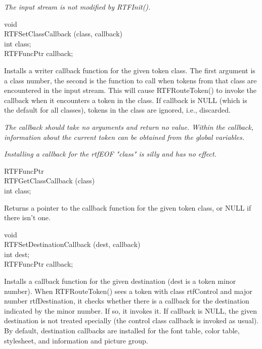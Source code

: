 \documentclass{article}
\begin{document}
\noindent
{\em The input stream is not modified by RTFInit().



}
\noindent
void\\
RTFSetClassCallback (class, callback)\\
int		class;\\
RTFFuncPtr	callback;




\noindent
Installs a writer callback function for the given token class. The first 
argument is a class number, the second is the function to call when tokens 
from that class are encountered in the input stream. This will cause RTFRouteToken() 
to invoke the callback when it encounters a token in the class. If callback 
is NULL (which is the default for all classes), tokens in the class are ignored, 
i.e., discarded.



\noindent
{\em The callback should take no arguments and return no value. Within the 
callback, information about the current token can be obtained from the global 
variables.



\noindent
{\em Installing a callback for the rtfEOF "class" is silly and has no effect.



}}
\noindent
RTFFuncPtr\\
RTFGetClassCallback (class)\\
int	class;




\noindent
Returns a pointer to the callback function for the given token class, or 
NULL if there isn't one.




\noindent
void\\
RTFSetDestinationCallback (dest, callback)\\
int		dest;\\
RTFFuncPtr	callback;




\noindent
Installs a callback function for the given destination (dest is a token minor 
number). When RTFRouteToken() sees a token with class rtfControl and major 
number rtfDestination, it checks whether there is a callback for the destination 
indicated by the minor number. If so, it invokes it. If callback is NULL, 
the given destination is not treated specially (the control class callback 
is invoked as usual). By default, destination callbacks are installed for 
the font table, color table, stylesheet, and information and picture group.
\end{document}
